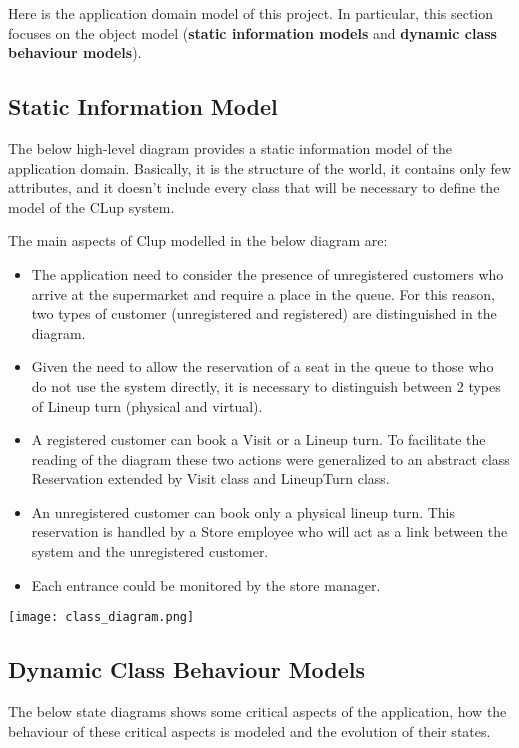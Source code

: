 Here is the application domain model of this project. In particular, this section focuses on the object model (\textbf{static information models} and \textbf{dynamic class behaviour models}).
\subsection{Static Information Model}
The below high-level diagram provides a static information model of the application domain. Basically, it is the structure of the world, it contains only few attributes, and it doesn't include every class that will be necessary to define the model of the CLup system. \newline

The main aspects of Clup modelled in the below diagram are:
\begin{itemize}
    \item The application need to consider the presence of unregistered customers who arrive at the supermarket and require a place in the queue. For this reason, two types of customer (unregistered and registered) are distinguished in the diagram.
    \item Given the need to allow the reservation of a seat in the queue to those who do not use the system directly, it is necessary to distinguish between 2 types of Lineup turn (physical and virtual).
    \item A registered customer can book a Visit or a Lineup turn. To facilitate the reading of the diagram these two actions were generalized to an abstract class Reservation extended by Visit class and LineupTurn class.
    \item An unregistered customer can book only a physical lineup turn. This reservation is handled by a Store employee who will act as a link between the system and the unregistered customer.
    \item Each entrance could be monitored by the store manager.
\end{itemize}
\texttt{[image: class\_diagram.png]}


\subsection{Dynamic Class Behaviour Models}
The below state diagrams shows some	critical aspects of	the	application, how the behaviour of these critical aspects is modeled and the evolution of their states. \newline

